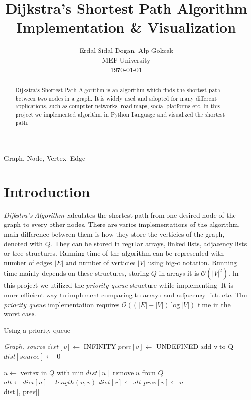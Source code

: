 \documentclass[twocolumns]{IEEEtran}
\author{Erdal Sidal Dogan, Alp Gokcek \\ MEF University \\ \today}
\title{Dijkstra's Shortest Path Algorithm Implementation \& Visualization}
\begin{document}
	\maketitle
	\begin{abstract}
		Dijkstra's Shortest Path Algorithm is an algorithm which finds the shortest path between two nodes in a graph. It is widely used and adopted for many different applications, such as computer networks, road maps, social platforms etc. In this project we implemented algorithm in Python Language and visualized the shortest path.
	\end{abstract}
	\begin{IEEEkeywords}
		Graph, Node, Vertex, Edge
	\end{IEEEkeywords}
	\section{Introduction}
	\textit{Dijkstra's Algorithm} calculates the shortest path from one desired node of the graph to every other nodes. There are varios implementations of the algorithm, main difference between them is how they store the verticies of the graph, denoted with $Q$. They can be stored in regular arrays, linked lists, adjacency lists or tree structures. Running time of the algorithm can be represented with number of edges $|E|$ and number of verticies $|V|$ using big-o notation. Running time mainly depends on these structures, storing $Q$ in arrays it is $\mathcal{O}(|V|^2)$. In this project we utilized the \textit{priority queue} structure while implementing. It is more efficient way to implement comparing to arrays and adjacency lists etc. The \textit{priority queue} implementation requires $\mathcal{O}((|E| + |V|) \log{|V|})$ time in the worst case. 
	\begin{algorithm}
		\caption{Using a priority queue \cite{wiki}}
		\begin{algorithmic}[1]
			 {\textit{Graph, source}}
					\State $dist[v] \leftarrow$ INFINITY                  
					\State $prev[v] \leftarrow$ UNDEFINED
					\State add v to Q                      
				\EndFor
				\State $dist[source] \leftarrow$ 0
	
					\State $u \leftarrow$ vertex in $Q$ with min $dist[u]$
					\State remove $u$ from $Q$
						\State $alt \leftarrow dist[u] + length(u, v)$
							\State $dist[v] \leftarrow alt$
							\State $prev[v] \leftarrow u$
						\EndIf
					\EndFor
				\EndWhile \\
				\Return dist[], prev[]
			\EndFunction
		\end{algorithmic}
	\end{algorithm}
\end{document}
